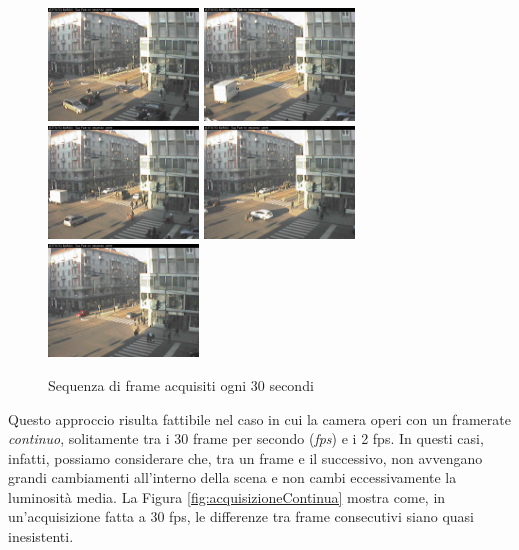 \begin{figure}[tb]
	\includegraphics[width = 4cm]{./pictures/FPSbasso/image2698}
	\includegraphics[width = 4cm]{./pictures/FPSbasso/image2699}
	\includegraphics[width = 4cm]{./pictures/FPSbasso/image2700}
	\includegraphics[width = 4cm]{./pictures/FPSbasso/image2701}
	\includegraphics[width = 4cm]{./pictures/FPSbasso/image2702}
	\caption{Sequenza di frame acquisiti ogni 30 secondi}
	\label{fig:acquisizioneBassa}
\end{figure}
Questo approccio risulta fattibile nel caso in cui la camera operi con un framerate \textit{continuo}, solitamente tra i 30 frame per secondo (\textit{fps}) e i 2 fps. 
In questi casi, infatti, possiamo considerare che, tra un frame e il successivo, non avvengano grandi cambiamenti all'interno della scena e non cambi eccessivamente la luminosit\`a media.
La Figura \ref{fig:acquisizioneContinua} mostra come, in un'acquisizione fatta a 30 fps, le differenze tra frame consecutivi siano quasi inesistenti. 

